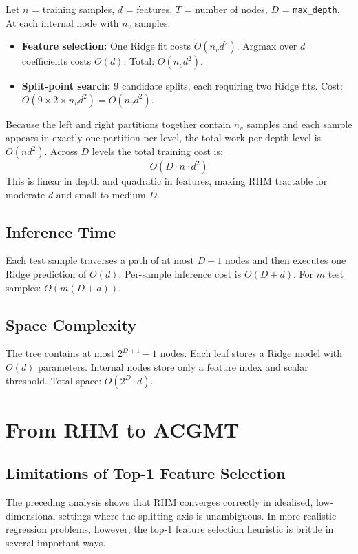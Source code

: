 \documentclass[11pt,a4paper]{article}
\begin{document}
Let $n$ = training samples, $d$ = features, $T$ = number of nodes, $D$ = \texttt{max\_depth}. At each internal node with $n_v$ samples:
\begin{itemize}
    \item \textbf{Feature selection:} One Ridge fit costs $O(n_v d^2)$. Argmax over $d$ coefficients costs $O(d)$. Total: $O(n_v d^2)$.
    \item \textbf{Split-point search:} 9 candidate splits, each requiring two Ridge fits. Cost: $O(9 \times 2 \times n_v d^2) = O(n_v d^2)$.
\end{itemize}
Because the left and right partitions together contain $n_v$ samples and each sample appears in exactly one partition per level, the total work per depth level is $O(nd^2)$. Across $D$ levels the total training cost is:
\[
    O(D \cdot n \cdot d^2)
\]
This is linear in depth and quadratic in features, making RHM tractable for moderate $d$ and small-to-medium $D$.

\subsection{Inference Time}

Each test sample traverses a path of at most $D + 1$ nodes and then executes one Ridge prediction of $O(d)$. Per-sample inference cost is $O(D + d)$. For $m$ test samples: $O(m(D + d))$.

\subsection{Space Complexity}

The tree contains at most $2^{D+1} - 1$ nodes. Each leaf stores a Ridge model with $O(d)$ parameters. Internal nodes store only a feature index and scalar threshold. Total space: $O(2^D \cdot d)$.

\section{From RHM to ACGMT}\label{sec:acgmt}

\subsection{Limitations of Top-1 Feature Selection}

The preceding analysis shows that RHM converges correctly in idealised, low-dimensional settings where the splitting axis is unambiguous. In more realistic regression problems, however, the top-1 feature selection heuristic is brittle in several important ways.
\end{document}
